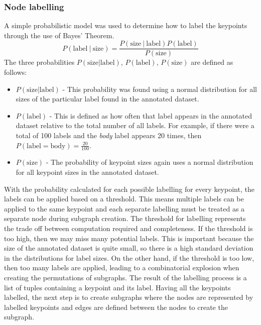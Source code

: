 \subsubsection{Node labelling}\label{sec:probabilistic-model}
A simple probabilistic model was used to determine how to label the keypoints through the use of Bayes' Theorem. 
\begin{equation}
P(\text{label}\ |\ \text{size}) = \frac{P(\text{size}\ |\ \text{label}) P(\text{label})} {P(\text{size})}
\end{equation}
The three probabilities $P(\text{size} | \text{label})$, $P(\text{label})$, $P(\text{size})$ are defined as follows:
\begin{itemize}
\item $P(\text{size} | \text{label})$ - This probability was found using a normal distribution for all sizes of the particular label found in the annotated dataset.
\item $P(\text{label})$ - This is defined as how often that label appears in the annotated dataset relative to the total number of all labels. For example, if there were a total of 100 labels and the \textit{body} label appears 20 times, then $P(\text{label} = \text{body}) = \frac{20}{100}$.
\item $P(\text{size})$ - The probability of keypoint sizes again uses a normal distribution for all keypoint sizes in the annotated dataset.
\end{itemize}
With the probability calculated for each possible labelling for every keypoint, the labels can be applied based on a threshold. This means multiple labels can be applied to the same keypoint and each separate labelling must be treated as a separate node during subgraph creation. The threshold for labelling represents the trade off between computation required and completeness. If the threshold is too high, then we may miss many potential labels. This is important because the size of the annotated dataset is quite small, so there is a high standard deviation in the distributions for label sizes. On the other hand, if the threshold is too low, then too many labels are applied, leading to a combinatorial explosion when creating the permutations of subgraphs. The result of the labelling process is a list of tuples containing a keypoint and its label. Having all the keypoints labelled, the next step is to create subgraphs where the nodes are represented by labelled keypoints and edges are defined  between the nodes to create the subgraph. 

